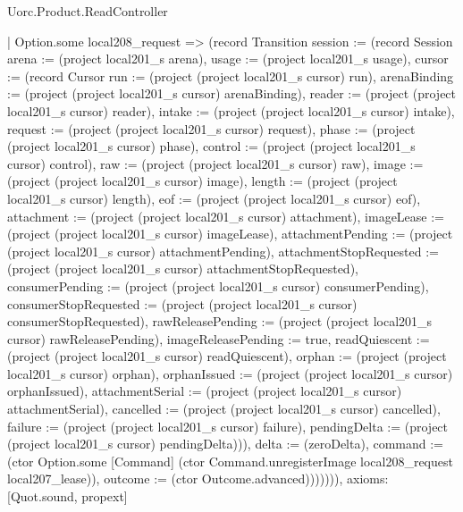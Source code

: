 \begin{lexlean}{Uorc.Product.ReadController}
\begin{semanticmodule}
{      | Option.some local208_request => (record Transition {session := (record Session {arena := (project local201_s arena), usage := (project local201_s usage), cursor := (record Cursor {run := (project (project local201_s cursor) run), arenaBinding := (project (project local201_s cursor) arenaBinding), reader := (project (project local201_s cursor) reader), intake := (project (project local201_s cursor) intake), request := (project (project local201_s cursor) request), phase := (project (project local201_s cursor) phase), control := (project (project local201_s cursor) control), raw := (project (project local201_s cursor) raw), image := (project (project local201_s cursor) image), length := (project (project local201_s cursor) length), eof := (project (project local201_s cursor) eof), attachment := (project (project local201_s cursor) attachment), imageLease := (project (project local201_s cursor) imageLease), attachmentPending := (project (project local201_s cursor) attachmentPending), attachmentStopRequested := (project (project local201_s cursor) attachmentStopRequested), consumerPending := (project (project local201_s cursor) consumerPending), consumerStopRequested := (project (project local201_s cursor) consumerStopRequested), rawReleasePending := (project (project local201_s cursor) rawReleasePending), imageReleasePending := true, readQuiescent := (project (project local201_s cursor) readQuiescent), orphan := (project (project local201_s cursor) orphan), orphanIssued := (project (project local201_s cursor) orphanIssued), attachmentSerial := (project (project local201_s cursor) attachmentSerial), cancelled := (project (project local201_s cursor) cancelled), failure := (project (project local201_s cursor) failure), pendingDelta := (project (project local201_s cursor) pendingDelta)})}), delta := (zeroDelta), command := (ctor Option.some [Command] (ctor Command.unregisterImage local208_request local207_lease)), outcome := (ctor Outcome.advanced)})))))),
  axioms: [Quot.sound, propext]
}


\end{semanticmodule}
\end{lexlean}
